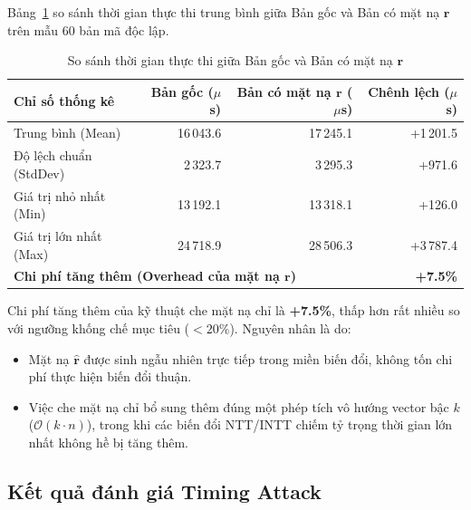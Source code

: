 \documentclass[../LuanVan.tex]{subfiles}
\begin{document}
Bảng~\ref{tab:benchmark} so sánh thời gian thực thi trung bình giữa Bản gốc và Bản có mặt nạ $\mathbf{r}$ trên mẫu 60 bản mã độc lập.

\begin{table}[H]
\centering
\caption{So sánh thời gian thực thi giữa Bản gốc và Bản có mặt nạ $\mathbf{r}$}
\label{tab:benchmark}
\begin{tabular}{l r r r}
\toprule
\textbf{Chỉ số thống kê} & \textbf{Bản gốc ($\mu$s)} & \textbf{Bản có mặt nạ $\mathbf{r}$ ($\mu$s)} & \textbf{Chênh lệch ($\mu$s)} \\
\midrule
Trung bình (Mean) & 16\,043.6 & 17\,245.1 & +1\,201.5 \\
Độ lệch chuẩn (StdDev) & 2\,323.7 & 3\,295.3 & +971.6 \\
Giá trị nhỏ nhất (Min) & 13\,192.1 & 13\,318.1 & +126.0 \\
Giá trị lớn nhất (Max) & 24\,718.9 & 28\,506.3 & +3\,787.4 \\
\midrule
\multicolumn{3}{l}{\textbf{Chi phí tăng thêm (Overhead của mặt nạ $\mathbf{r}$)}} & \textbf{+7.5\%} \\
\bottomrule
\end{tabular}
\end{table}

Chi phí tăng thêm của kỹ thuật che mặt nạ chỉ là \textbf{+7.5\%}, thấp hơn rất nhiều so với ngưỡng khống chế mục tiêu ($< 20\%$). Nguyên nhân là do:
\begin{itemize}[leftmargin=2cm]
    \item Mặt nạ $\hat{\mathbf{r}}$ được sinh ngẫu nhiên trực tiếp trong miền biến đổi, không tốn chi phí thực hiện biến đổi thuận.
    \item Việc che mặt nạ chỉ bổ sung thêm đúng một phép tích vô hướng vector bậc $k$ ($\mathcal{O}(k \cdot n)$), trong khi các biến đổi NTT/INTT chiếm tỷ trọng thời gian lớn nhất không hề bị tăng thêm.
\end{itemize}


\subsection{Kết quả đánh giá Timing Attack}
\end{document}
